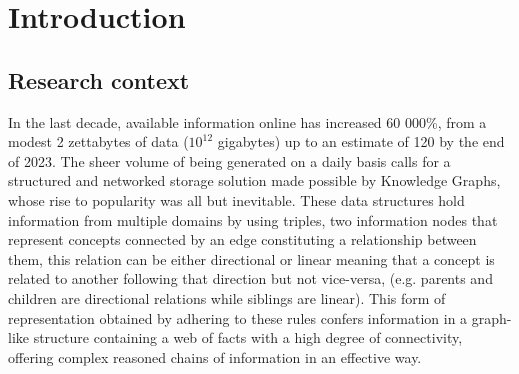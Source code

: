 \chapter{Introduction}\label{chap:introduction}



\section{Research context}\label{sec:intro-context}

In the last decade, available information online has increased 60 000\%, from a modest 2 zettabytes of data ($10^{12}$ gigabytes) up to an estimate of 120 by the end of 2023\cite{Marr2021}. The sheer volume of being generated on a daily basis calls for a structured and networked storage solution made possible by Knowledge Graphs, whose rise to popularity was all but inevitable. 
These data structures hold information from multiple domains by using triples, two information nodes that represent concepts connected by an edge constituting a relationship between them, this relation can be either directional or linear meaning that a concept is related to another following that direction but not vice-versa, (e.g. parents and children are directional relations while siblings are linear).
This form of representation obtained by adhering to these rules confers information in a graph-like structure containing a web of facts with a high degree of connectivity, offering complex reasoned chains of information in an effective way.

